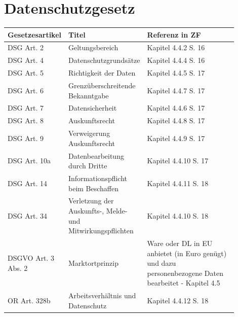 \documentclass{report}
\theoremstyle{definition}
\theoremstyle{example}
\begin{document}
\section{Datenschutzgesetz}
\begin{tabular}[h]{p{0.15\linewidth}|p{0.25\linewidth}|p{0.50\linewidth}}
   \textbf{Gesetzesartikel} & \textbf{Titel} & \textbf{Referenz in ZF} \\
   \hline
   DSG Art. 2 & Geltungsbereich & Kapitel 4.4.2 S. 16 \\
   \hline
   DSG Art. 4 & Datenschutzgrundsätze & Kapitel 4.4.4 S. 16 \\
   \hline
   DSG Art. 5 & Richtigkeit der Daten & Kapitel 4.4.5 S. 17 \\
   \hline
   DSG Art. 6 & Grenzüberschreitende Bekanntgabe & Kapitel 4.4.7 S. 17 \\
   \hline
   DSG Art. 7 & Datensicherheit & Kapitel 4.4.6 S. 17 \\
   \hline
   DSG Art. 8 & Auskunftsrecht & Kapitel 4.4.8 S. 17 \\
   \hline
   DSG Art. 9 & Verweigerung Auskunftsrecht & Kapitel 4.4.9 S. 17 \\
   \hline
   DSG Art. 10a & Datenbearbeitung durch Dritte & Kapitel 4.4.10 S. 17 \\
   \hline
   DSG Art. 14 & Informationspflicht beim Beschaffen & Kapitel 4.4.11 S. 18 \\
   \hline
   DSG Art. 34 & Verletzung der Auskunfts-, Melde- und Mitwirkungspflichten & Kapitel 4.4.10 S. 18 \\
   \hline
   DSGVO Art. 3 Abs. 2 & Marktortprinzip & Ware oder DL in EU anbietet (in Euro genügt) und dazu personenbezogene Daten bearbeitet - Kapitel 4.5\\
   \hline
   OR Art. 328b & Arbeitsverhältnis und Datenschutz & Kapitel 4.4.12 S. 18 \\
\end{tabular}
\end{document}
